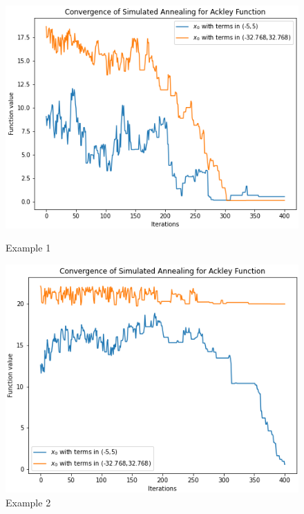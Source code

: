 \begin{figure}[h]
  \centering
  \begin{minipage}[b]{0.3687\textwidth}
    \includegraphics[width=\textwidth]{Pictures/sa_convergence-ackley3-38-c.png}
    \caption{Example 1}\label{fig:SA_conv1}
  \end{minipage}
  \hspace{0.05cm} 
  \begin{minipage}[b]{0.36\textwidth}
    \includegraphics[width=\textwidth]{Pictures/sa_convergence-ackley3-37_c.png}
    \caption{Example 2}\label{fig:SA_conv2}
  \end{minipage}
\end{figure}
